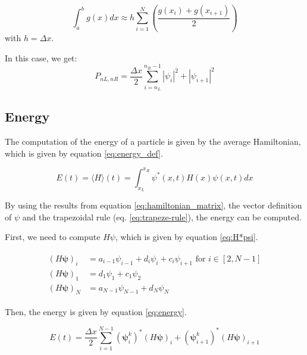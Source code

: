 \documentclass[a4paper,12pt,twoside]{article}
\newcommand{\mbf}[1]{\mathbf{#1}} %
\newcommand{\bracket}[1]{\left(#1\right)}
\begin{document}
    \begin{equation}
      \int_a^b g(x)dx \approx h\sum_{i=1}^N\bracket{\frac{g(x_i) + g(x_{i+1})}{2}}
      \label{eq:trapeze-rule}
    \end{equation}
    with $h = \Delta x$.

    In this case, we get:
    \begin{equation}
     P_{nL,nR}=\frac{\Delta x}{2}\sum_{i=n_L}^{n_R-1} |\psi_i|^2+|\psi_{i+1}|^2
    \end{equation}


  \subsection{Energy}
    The computation of the energy of a particle is given by the average Hamiltonian, which is given by equation \eqref{eq:energy_def}.

    \begin{equation}
      E(t) = \langle H \rangle(t) = \int_{x_L}^{x_R}\psi^*(x,t)H(x)\psi(x,t)dx
      \label{eq:energy_def}
    \end{equation}

    By using the results from equation \eqref{eq:hamiltonian_matrix}, the vector definition of $\psi$ and the trapezoidal rule (eq. \eqref{eq:trapeze-rule}), the energy can be computed.

    First, we need to compute $H\psi$, which is given by equation \eqref{eq:H*psi}.

    \begin{align}
      \begin{split}
        (H\mbf{\psi})_i &= a_{i-1}\psi_{i-1} + d_i\psi_i + c_i\psi_{i+1} \text{ for } i\in[2, N-1]\\
        (H\mbf{\psi})_1 &= d_1\psi_1 + c_1\psi_2 \\
        (H\mbf{\psi})_N &= a_{N-1}\psi_{N-1} + d_N\psi_N
      \end{split}
      \label{eq:H*psi}
    \end{align}

    Then, the energy is given by equation \eqref{eq:energy}.

    \begin{equation}
      E(t) = \frac{\Delta x}{2}\sum_{i=1}^{N-1} (\mbf{\psi}_i^k)^*(H\mbf{\psi})_i + (\mbf{\psi}_{i+1}^k)^*(H\mbf{\psi})_{i+1}
      \label{eq:energy}
    \end{equation}
\end{document}
